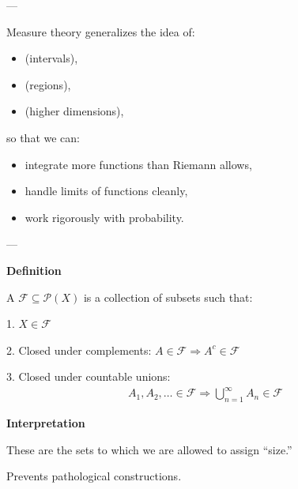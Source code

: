 \documentclass[12pt,a4paper]{report}
\begin{document}
---
\begin{description}

\item {}

Measure theory generalizes the idea of:
		\begin{itemize}
        \item {} (intervals),
        \item {} (regions),
        \item {} (higher dimensions),
		\end{itemize}
so that we can:
		\begin{itemize}
        \item integrate more functions than Riemann allows,
        \item handle limits of functions cleanly,
        \item work rigorously with probability.
		\end{itemize}

---

\item {}

	\begin{description}
    \item \textbf{Definition}

A  $\mathcal{F} \subseteq \mathcal{P}(X)$ is a collection of subsets such that:

		\begin{description}
        \item 1. $X \in \mathcal{F}$
        \item 2. Closed under complements: $A \in \mathcal{F} \Rightarrow A^c \in \mathcal{F}$
        \item 3. Closed under countable unions:
   \begin{align*} 
       A_1, A_2, \dots \in \mathcal{F} \Rightarrow \bigcup_{n=1}^\infty A_n \in \mathcal{F}
   \end{align*} 
   
		\end{description}

    \item \textbf{Interpretation}

		\begin{description}
        \item These are the sets to which we are allowed to assign “size.”
        \item Prevents pathological constructions.
		\end{description}


\end{description}
\end{description}
\end{document}
